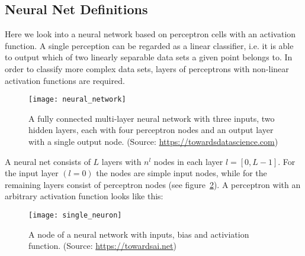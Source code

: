 \subsection{Neural Net Definitions}

Here we look into a neural network based on perceptron cells with an activation function.
A single perception can be regarded as a linear classifier, i.e. it is able to output
which of two linearly separable data sets a given point belongs to. In order to classify
more complex data sets, layers of perceptrons with non-linear activation functions are
required.

\begin{figure}[h] \centering \texttt{[image: neural\_network]}
    \caption{A fully connected multi-layer neural network with three inputs, two hidden
    layers, each with four perceptron nodes and an output layer with a single output node.
    (Source: \url{https://towardsdatascience.com})} \label{fig:neural_network}
\end{figure}

A neural net consists of $L$ layers with $n^l$ nodes in each layer $l=[0,L-1]$. For the
input layer $(l=0)$ the nodes are simple input nodes, while for the remaining layers
consist of perceptron nodes (see figure~\ref{fig:perceptron}). A perceptron with an
arbitrary activation function looks like this:
\begin{figure}[h] \centering \texttt{[image: single\_neuron]}
    \caption{A node of a neural network with inputs, bias and activiation function.
    (Source: \url{https://towardsai.net})}
    \label{fig:perceptron}
\end{figure}

